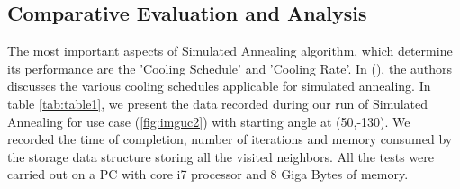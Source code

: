 \subsection{Comparative Evaluation and Analysis}
The most important aspects of Simulated Annealing algorithm, which determine its performance are the 'Cooling Schedule' and 'Cooling Rate'. In (\citet{nourani1998comparison}), the authors discusses the various cooling schedules applicable for simulated annealing. In table \ref{tab:table1}, we present the data recorded during our run of Simulated Annealing for use case (\ref{fig:imguc2}) with starting angle at (50,-130). We recorded the time of completion, number of iterations and memory consumed by the storage data structure storing all the visited neighbors. All the tests were carried out on a PC with core i7 processor and 8 Giga Bytes of memory. 

